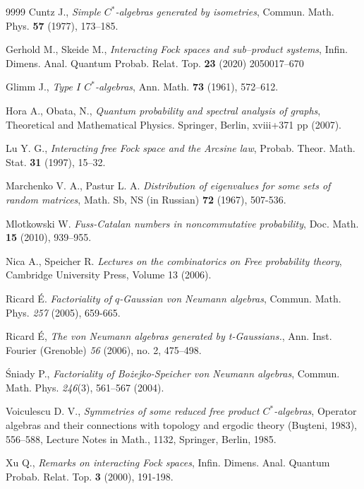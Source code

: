 \documentclass[12pt]{amsart}
\numberwithin{equation}{section}
\theoremstyle{definition}
\begin{document}
\begin{thebibliography}{9999}
 Cuntz J., \emph{Simple $C^*$-algebras generated by isometries}, Commun. Math. Phys. \textbf{57} (1977), 173–185.

 Gerhold M., Skeide M., \emph{Interacting Fock spaces and sub–product systems}, Infin. Dimens. Anal. Quantum Probab. Relat. Top. \textbf{23} (2020) 2050017–670

 Glimm J., \emph{Type $I$ $C^*$-algebras}, Ann. Math. \textbf{73} (1961), 572–612.

 Hora A., Obata, N., \emph{Quantum probability and spectral analysis of graphs}, Theoretical and Mathematical
Physics. Springer, Berlin, xviii+371 pp (2007).

 Lu Y. G., \emph{ Interacting free Fock space and the Arcsine law}, Probab. Theor. Math. Stat. \textbf{31} (1997), 15–32.

 Marchenko V. A., Pastur L. A. \emph{Distribution of eigenvalues for some sets of random matrices}, Math. Sb, NS (in Russian) \textbf{72} (1967), 507-536.

 Mlotkowski W. \emph{Fuss-Catalan numbers in noncommutative probability},  Doc. Math. \textbf{15} (2010), 939–955.

 Nica A., Speicher R. \emph{Lectures on the combinatorics on Free probability theory}, Cambridge University Press, Volume 13 (2006).

 Ricard \'E. \emph{Factoriality of $q$-Gaussian von Neumann algebras}, Commun. Math. Phys. \textit{257} (2005), 659-665.

 Ricard \'E, \emph{The von Neumann algebras generated by t-Gaussians.}, Ann. Inst. Fourier (Grenoble) \textit{56} (2006), no. 2, 475–498.

 \'Sniady P., \emph{Factoriality of Bożejko-Speicher von Neumann algebras}, Commun. Math. Phys. \textit{246}(3), 561–567 (2004).

 Voiculescu D. V., \emph{Symmetries of some reduced free product $C^*$-algebras}, Operator algebras and their connections with topology and ergodic theory (Buşteni, 1983), 556–588, Lecture Notes in Math., 1132, Springer, Berlin, 1985.

 Xu Q., \emph{Remarks on interacting Fock spaces}, Infin. Dimens. Anal. Quantum Probab. Relat. Top. \textbf{3} (2000), 191-198.

\end{thebibliography}
\end{document}
